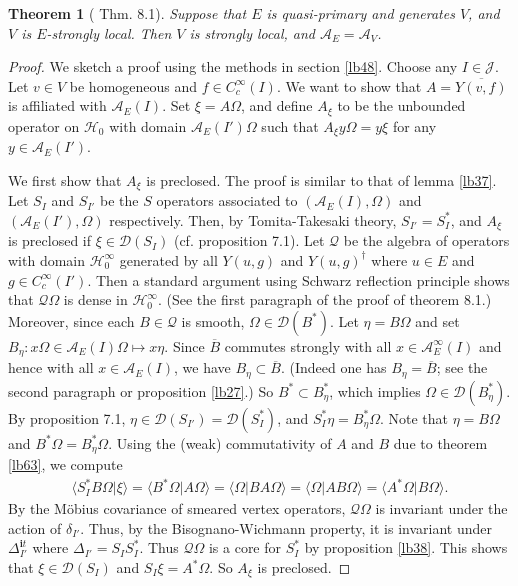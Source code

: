 \documentclass[12pt,a4paper]{article}
\theoremstyle{definition}
\theoremstyle{plain}
\newtheorem{thm}[df]{Theorem}
\newcommand{\mc}{\mathcal}
\newcommand{\ovl}{\overline}
\newcommand{\Dom}{\scr D}
\newcommand{\bk}[1]{\langle {#1}\rangle}
\newcommand{\scr}{\mathscr}
\newcommand{\im}{\mathbf{i}}
\numberwithin{equation}{subsection}
\begin{document}
\begin{thm}[\cite{CKLW18} Thm. 8.1]\label{lb43}
Suppose that $E$ is quasi-primary and generates $V$, and $V$ is $E$-strongly local. Then $V$ is strongly local, and $\mc A_E=\mc A_V$.
\end{thm}

\begin{proof}
We sketch a proof using the methods in section \ref{lb48}. Choose any $I\in\mc J$. Let $v\in V$ be homogeneous and $f\in C_c^\infty(I)$. We want to show that $A=\ovl{Y(v,f)}$ is affiliated with $\mc A_E(I)$. Set $\xi=A\Omega$, and define $A_\xi$ to be the unbounded operator on $\mc H_0$ with domain $\mc A_E(I')\Omega$ such that $A_\xi y\Omega=y\xi$ for any $y\in\mc A_E(I')$. 

We first show that $A_\xi$ is preclosed. The proof is similar to that of lemma \ref{lb37}. Let $S_I$ and $S_{I'}$ be the $S$  operators associated to $(\mc A_E(I),\Omega)$ and $(\mc A_E(I'),\Omega)$ respectively. Then, by Tomita-Takesaki theory, $S_{I'}=S_I^*$, and $A_\xi$ is preclosed if $\xi\in\Dom(S_I)$ (cf. \cite{Gui21b} proposition 7.1). Let $\mc Q$ be the algebra of operators with domain $\mc H_0^\infty$ generated by all $Y(u,g)$ and $Y(u,g)^\dagger$ where $u\in E$ and $g\in C_c^\infty(I')$. Then a standard argument using Schwarz reflection principle shows that $\mc Q\Omega$ is dense in $\mc H_0^\infty$. (See the first paragraph of the proof of \cite{CKLW18} theorem 8.1.) Moreover, since each $B\in\mc Q$ is smooth, $\Omega\in\Dom(B^*)$. Let $\eta=B\Omega$ and set $B_\eta:x\Omega\in\mc A_E(I)\Omega\mapsto x\eta$. Since  $\ovl B$ commutes strongly with all $x\in\mc A_E^\infty(I)$ and hence with all $x\in\mc A_E(I)$, we have $B_\eta\subset \ovl B$. (Indeed one has $B_\eta=\ovl B$; see the second paragraph or proposition \ref{lb27}.) So $B^*\subset B_\eta^*$, which implies $\Omega\in\Dom(B_\eta^*)$. By \cite{Gui21b} proposition 7.1, $\eta\in\Dom(S_{I'})=\Dom(S_I^*)$, and $S_I^*\eta=B_\eta^*\Omega$. Note that $\eta=B\Omega$ and $B^*\Omega=B_\eta^*\Omega$. Using the (weak) commutativity of $A$ and $B$ due to theorem \ref{lb63}, we compute
\begin{align*}
\bk{S_I^*B\Omega|\xi}=\bk{B^*\Omega|A\Omega}=\bk{\Omega|BA\Omega}=\bk{\Omega|AB\Omega}=\bk{A^*\Omega|B\Omega}.
\end{align*}
By the M\"obius covariance of smeared vertex operators, $\mc Q\Omega$ is invariant under the action of $\delta_{I'}$. Thus, by the Bisognano-Wichmann property, it is invariant under $\Delta_{I'}^{\im t}$ where $\Delta_{I'}=S_IS_I^*$. Thus $\mc Q\Omega$ is a core for $S_I^*$ by proposition \ref{lb38}. This shows that $\xi\in\Dom(S_I)$ and $S_I\xi=A^*\Omega$. So $A_\xi$ is preclosed.


\end{proof}
\end{document}

